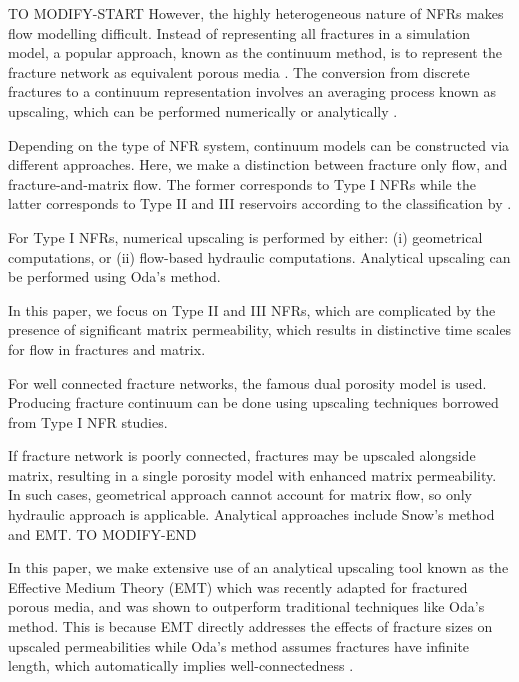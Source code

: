 \documentclass[draft]{agujournal2018}
\begin{document}
TO MODIFY-START
However, the highly heterogeneous nature of NFRs makes flow modelling difficult. Instead of representing all fractures in a simulation model, a popular approach, known as the continuum method, is to represent the fracture network as equivalent porous media \citep[e.g.][]{Berre2018a, Lemonnier2010a, Lemonnier2010, Warren1963, Yan2016}. The conversion from discrete fractures to a continuum representation involves an averaging process known as upscaling, which can be performed numerically or analytically \citep{Durlofsky1991,Oda1985,Renard1997,Saevik2013}.

Depending on the type of NFR system, continuum models can be constructed via different approaches. Here, we make a distinction between fracture only flow, and fracture-and-matrix flow. The former corresponds to Type I NFRs while the latter corresponds to Type II and III reservoirs according to the classification by \citet{Nelson2001}.

For Type I NFRs, numerical upscaling is performed by either: (i) geometrical computations, or (ii) flow-based hydraulic computations. Analytical upscaling can be performed using Oda's method.

In this paper, we focus on Type II and III NFRs, which are complicated by the presence of significant matrix permeability, which results in distinctive time scales for flow in fractures and matrix. 

For well connected fracture networks, the famous dual porosity model is used. Producing fracture continuum can be done using upscaling techniques borrowed from Type I NFR studies.

If fracture network is poorly connected, fractures may be upscaled alongside matrix, resulting in a single porosity model with enhanced matrix permeability. In such cases, geometrical approach cannot account for matrix flow, so only hydraulic approach is applicable. Analytical approaches include Snow's method and EMT. 
TO MODIFY-END

In this paper, we make extensive use of an analytical upscaling tool known as the Effective Medium Theory (EMT) which was recently adapted for fractured porous media, and was shown to outperform traditional techniques like Oda's method. This is because EMT directly addresses the effects of fracture sizes on upscaled permeabilities while Oda's method assumes fractures have infinite length, which automatically implies well-connectedness \citep{Oda1985, Saevik2013, Saevik2014}.
\end{document}
